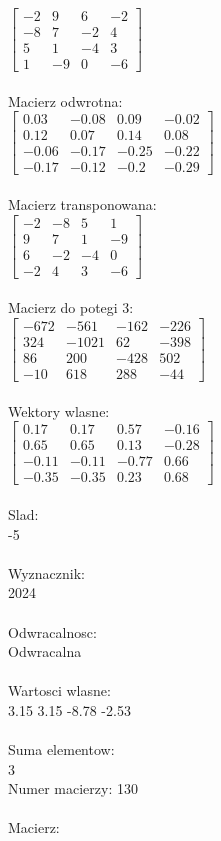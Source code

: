 \documentclass[a4paper,12pt]{article}
\begin{document}
$\begin{bmatrix} -2&9&6&-2\\-8&7&-2&4\\5&1&-4&3\\1&-9&0&-6 \end{bmatrix}$
\\
\\
Macierz odwrotna:\\

$\begin{bmatrix} 0.03&-0.08&0.09&-0.02\\0.12&0.07&0.14&0.08\\-0.06&-0.17&-0.25&-0.22\\-0.17&-0.12&-0.2&-0.29 \end{bmatrix}$
\\
\\
Macierz transponowana:\\

$\begin{bmatrix} -2&-8&5&1\\9&7&1&-9\\6&-2&-4&0\\-2&4&3&-6 \end{bmatrix}$
\\
\\
Macierz do potegi 3:\\

$\begin{bmatrix} -672&-561&-162&-226\\324&-1021&62&-398\\86&200&-428&502\\-10&618&288&-44 \end{bmatrix}$
\\
\\
Wektory wlasne:\\

$\begin{bmatrix} 0.17&0.17&0.57&-0.16\\0.65&0.65&0.13&-0.28\\-0.11&-0.11&-0.77&0.66\\-0.35&-0.35&0.23&0.68 \end{bmatrix}$
\\
\\
Slad:\\
-5
\\
\\
Wyznacznik:\\
2024
\\
\\
Odwracalnosc:\\
Odwracalna
\\
\\
Wartosci wlasne:\\
3.15 3.15 -8.78 -2.53
\\
\\
Suma elementow:\\
3
\\
\newpage
Numer macierzy:
130
\\
\\
Macierz:\\
\end{document}
